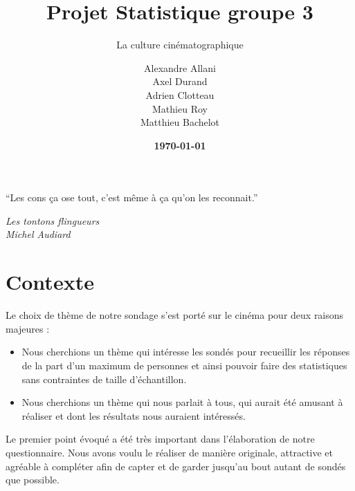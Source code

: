 \documentclass{article} %
\author{Alexandre Allani\\
	Axel Durand\\
	Adrien Clotteau\\
	Mathieu Roy\\ 
	Matthieu Bachelot}
\date{\textbf{\noexpand\today}}%
\title{Projet Statistique groupe 3}
\subtitle{La culture cinématographique}
\begin{document}
\imtaMaketitlepage
\tableofcontents
\newpage
\epigraph{\large“Les cons ça ose tout, c’est même à ça qu’on les reconnait.”}{\textit{Les tontons flingueurs\\ Michel Audiard}}
\section{Contexte}
Le choix de thème de notre sondage s’est porté sur le cinéma pour deux raisons majeures : 
\begin{itemize}
	\vspace{-0.2cm}
	\setlength\itemsep{0.0cm}
	\item Nous cherchions un thème qui intéresse les sondés pour recueillir les réponses de la part d’un maximum de personnes et ainsi pouvoir faire des statistiques sans contraintes de taille d’échantillon.
	\item Nous cherchions un thème qui nous parlait à tous, qui aurait été amusant à réaliser et dont les résultats nous auraient intéressés.
\end{itemize}
Le premier point évoqué a été très important dans l’élaboration de notre questionnaire. Nous avons voulu le réaliser de manière originale, attractive et agréable à compléter afin de capter et de garder jusqu’au bout autant de sondés que possible. 
\end{document}

